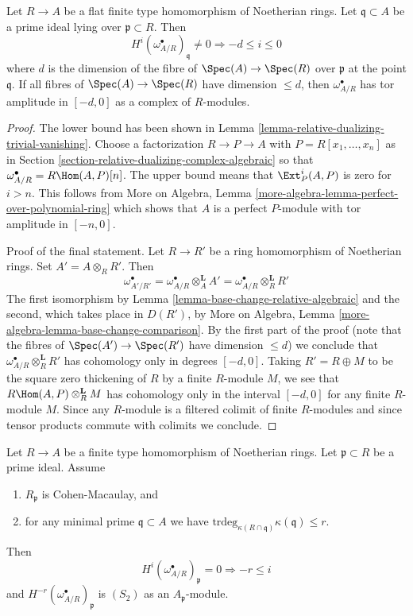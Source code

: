 \begin{lemma}
\label{lemma-relative-dualizing-flat-vanishing}
Let $R \to A$ be a flat finite type homomorphism of Noetherian rings.
Let $\mathfrak q \subset A$ be a prime ideal lying over
$\mathfrak p \subset R$. Then
$$
H^i(\omega_{A/R}^\bullet)_\mathfrak q \not = 0
\Rightarrow - d \leq i \leq 0
$$
where $d$ is the dimension of the fibre of $\Spec(A) \to \Spec(R)$
over $\mathfrak p$ at the point $\mathfrak q$. If all fibres of
$\Spec(A) \to \Spec(R)$ have dimension $\leq d$, then
$\omega_{A/R}^\bullet$ has tor amplitude in $[-d, 0]$
as a complex of $R$-modules.
\end{lemma}

\begin{proof}
The lower bound has been shown in
Lemma \ref{lemma-relative-dualizing-trivial-vanishing}.
Choose a factorization $R \to P \to A$ with $P = R[x_1, \ldots, x_n]$
as in Section \ref{section-relative-dualizing-complex-algebraic}
so that $\omega_{A/R}^\bullet = R\Hom(A, P)[n]$.
The upper bound means that $\Ext^i_P(A, P)$ is zero for $i > n$.
This follows from
More on Algebra, Lemma \ref{more-algebra-lemma-perfect-over-polynomial-ring}
which shows that $A$ is a perfect $P$-module with
tor amplitude in $[-n, 0]$.

\medskip\noindent
Proof of the final statement. Let $R \to R'$ be a ring homomorphism
of Noetherian rings. Set $A' = A \otimes_R R'$. Then
$$
\omega_{A'/R'}^\bullet =
\omega_{A/R}^\bullet \otimes_A^\mathbf{L} A' =
\omega_{A/R}^\bullet \otimes_R^\mathbf{L} R'
$$
The first isomorphism by Lemma \ref{lemma-base-change-relative-algebraic}
and the second, which takes place in $D(R')$, by
More on Algebra, Lemma \ref{more-algebra-lemma-base-change-comparison}.
By the first part of the proof
(note that the fibres of $\Spec(A') \to \Spec(R')$ have dimension $\leq d$)
we conclude that $\omega_{A/R}^\bullet \otimes_R^\mathbf{L} R'$
has cohomology only in degrees $[-d, 0]$. Taking $R' = R \oplus M$
to be the square zero thickening of $R$ by a finite $R$-module $M$,
we see that $R\Hom(A, P) \otimes_R^\mathbf{L} M$
has cohomology only in the interval $[-d, 0]$ for any finite $R$-module $M$.
Since any $R$-module is a filtered colimit of finite $R$-modules
and since tensor products commute with colimits we conclude.
\end{proof}

\begin{lemma}
\label{lemma-relative-dualizing-CM-vanishing}
Let $R \to A$ be a finite type homomorphism of Noetherian rings.
Let $\mathfrak p \subset R$ be a prime ideal. Assume
\begin{enumerate}
\item $R_\mathfrak p$ is Cohen-Macaulay, and
\item for any minimal prime $\mathfrak q \subset A$ we have
$\text{trdeg}_{\kappa(R \cap \mathfrak q)} \kappa(\mathfrak q) \leq r$.
\end{enumerate}
Then
$$
H^i(\omega_{A/R}^\bullet)_\mathfrak p = 0 \Rightarrow - r \leq i
$$
and $H^{-r}(\omega_{A/R}^\bullet)_\mathfrak p$ is $(S_2)$
as an $A_\mathfrak p$-module.
\end{lemma}

